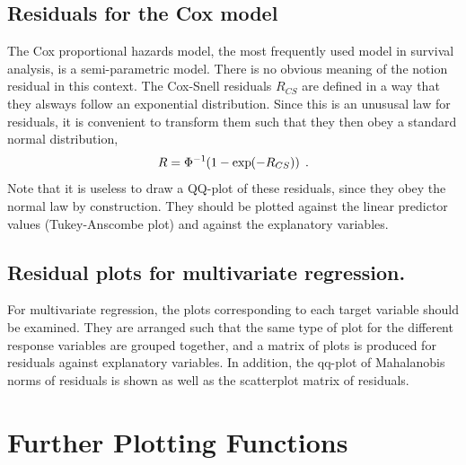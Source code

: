 \documentclass[11pt]{article}
\begin{document}
\subsection{Residuals for the Cox model}

The Cox proportional hazards model, the most frequently used model in
survival analysis, is a semi-parametric model. There is no obvious meaning
of the notion residual in this context. 
The Cox-Snell residuals $R_{CS}$ are defined in a way that they alsways
follow an exponential distribution. 
Since this is an unususal law for residuals, it is convenient to transform
them such that they then obey a standard normal distribution,
\[
  R = \Phi^{-1}\kern-2pt\left(1-\exp\kern-2pt\left(-R_{CS}\right)\right)
\;.\]
Note that it is useless to draw a QQ-plot of these residuals, since they
obey the normal law by construction. 
They should be plotted against the linear predictor values 
(Tukey-Anscombe plot) and against the explanatory variables.


\subsection{Residual plots for multivariate regression.}
For multivariate regression, the plots corresponding to each target
variable should be examined. 
They are arranged such that the same type of plot for the different
response variables are grouped together, and a matrix of plots is produced
for residuals against explanatory variables.
In addition, the qq-plot of Mahalanobis norms of residuals is shown as well
as the scatterplot matrix of residuals.

\Vneed{30mm}
\section{Further Plotting Functions}
\end{document}
